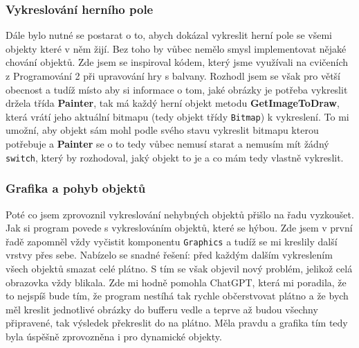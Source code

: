\documentclass[a4]{article}
\begin{document}
\subsubsection{Vykreslování herního pole}
Dále bylo nutné se postarat o to, abych dokázal vykreslit herní pole se všemi objekty které v něm žijí. Bez toho by vůbec nemělo smysl implementovat nějaké chování objektů. Zde jsem se inspiroval kódem, který jsme využívali na cvičeních z Programování 2 při upravování hry s balvany. Rozhodl jsem se však pro větší obecnost a tudíž místo aby si informace o tom, jaké obrázky je potřeba vykreslit držela třída \textbf{Painter}, tak má každý herní objekt metodu \textbf{GetImageToDraw}, která vrátí jeho aktuální bitmapu (tedy objekt třídy \verb|Bitmap|) k vykreslení. To mi umožní, aby objekt sám mohl podle svého stavu vykreslit bitmapu kterou potřebuje a \textbf{Painter} se o to tedy vůbec nemusí starat a nemusím mít žádný \verb|switch|, který by rozhodoval, jaký objekt to je a co mám tedy vlastně vykreslit.
\subsubsection{Grafika a pohyb objektů}
Poté co jsem zprovoznil vykreslování nehybných objektů přišlo na řadu vyzkoušet. Jak si program povede s vykreslováním objektů, které se hýbou. Zde jsem v první řadě zapomněl vždy vyčistit komponentu \verb|Graphics| a tudíž se mi kreslily další vrstvy přes sebe. Nabízelo se snadné řešení: před každým dalším vykreslením všech objektů smazat celé plátno. S tím se však objevil nový problém, jelikož celá obrazovka vždy blikala. Zde mi hodně pomohla ChatGPT, která mi poradila, že to nejspíš bude tím, že program nestíhá tak rychle občerstvovat plátno a že bych měl kreslit jednotlivé obrázky do bufferu vedle a teprve až budou všechny připravené, tak výsledek překreslit do na plátno. Měla pravdu a grafika tím tedy byla úspěšně zprovozněna i pro dynamické objekty.
\end{document}
